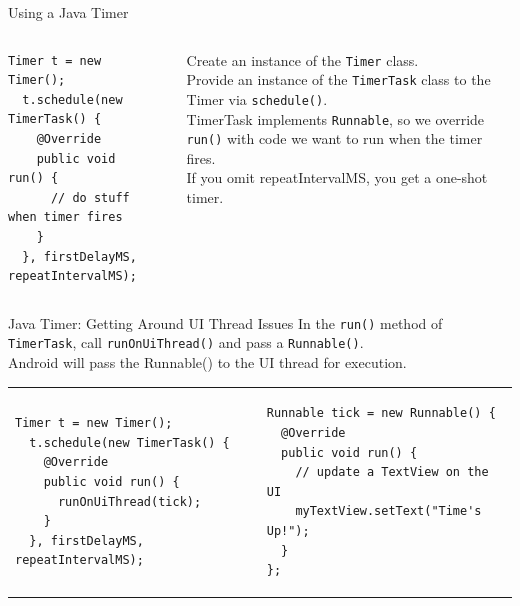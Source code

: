 \documentclass[aspectratio=169]{beamer}
\makeatletter
\newenvironment{splitslide}
{
\centering
\begin{tabular}{@{}p{0.50\textwidth} | p{0.025\textwidth}@{} p{0.4\textwidth}@{}}
}
{
\end{tabular}
}
\makeatother
\begin{document}
\begin{frame}[fragile]{Using a Java Timer}
\begin{columns}
\begin{column}{0.45\textwidth}
\begin{Verbatim}[fontsize=\footnotesize]
  Timer t = new Timer();
  t.schedule(new TimerTask() {
    @Override
    public void run() {
      // do stuff when timer fires
    }
  }, firstDelayMS, repeatIntervalMS);
\end{Verbatim}
\end{column}
\begin{column}{0.05\textwidth}\end{column}
\begin{column}{0.50\textwidth}
\begin{normalsize}
\pause
\vspace{0.5em}
Create an instance of the \texttt{Timer} class. \\
\pause
\vspace{1em}
Provide an instance of the \texttt{TimerTask} class to the Timer via \texttt{schedule()}. \\
\pause
\vspace{1em}
TimerTask implements \texttt{Runnable}, so we override \texttt{run()} with code we want to run when the timer fires. \\
\pause
\vspace{1em}
If you omit repeatIntervalMS, you get a one-shot timer.
\end{normalsize}
\end{column}
\end{columns}
\end{frame}



\begin{frame}[fragile]{Java Timer: Getting Around UI Thread Issues}
In the \texttt{run()} method of \texttt{TimerTask}, call \texttt{runOnUiThread()} and pass a \texttt{Runnable()}. \\
\vspace{0.5em}
Android will pass the Runnable() to the UI thread for execution. \\
\vspace{1em}
\begin{splitslide}

\begin{Verbatim}[fontsize=\footnotesize]
  Timer t = new Timer();
  t.schedule(new TimerTask() {
    @Override
    public void run() {
      runOnUiThread(tick);
    }
  }, firstDelayMS, repeatIntervalMS);
\end{Verbatim}

&&

\begin{Verbatim}[fontsize=\footnotesize]
Runnable tick = new Runnable() {
  @Override
  public void run() {
    // update a TextView on the UI
    myTextView.setText("Time's Up!");
  }
};
\end{Verbatim}

\end{splitslide}
\end{frame}
\end{document}
